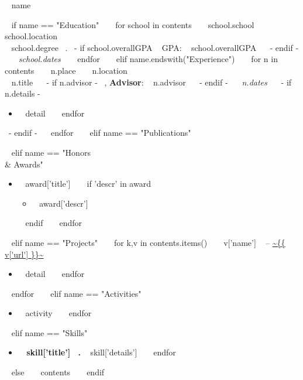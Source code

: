 \medskip

\begin{minipage}{\textwidth}
{\huge ~{{ name }}~ }

~{ if name == "Education" }~
  ~{ for school in contents }~
    {\large ~{{ school.school }}~ } \hfill ~{{ school.location }}~ \\
    ~{{ school.degree }}~.
    ~{- if school.overallGPA }~
      GPA: ~{{ school.overallGPA }}~
    ~{- endif -}~
    \hfill {\it ~{{ school.dates }}~}
    \bigskip
  ~{ endfor }~
~{ elif name.endswith("Experience") }~
  ~{ for n in contents }~
    {\large ~{{ n.place }}~ } \hfill ~{{ n.location }}~ \\
    ~{{ n.title }}~
    ~{- if n.advisor -}~
      , {\bf Advisor}: ~{{ n.advisor }}~
    ~{- endif -}~
    \hfill {\it ~{{ n.dates }}~}
    ~{- if n.details -}~
      \begin{itemize}
      ~{ for detail in n.details }~
        \item ~{{ detail }}~
      ~{ endfor }~
      \end{itemize}
    ~{- endif -}~
    \bigskip
  ~{ endfor }~
~{ elif name == "Publications" }~
  \nocite{*}
  \printbibliography[heading=none,type=inproceedings]
  \end{minipage}
  \begin{minipage}{\textwidth}
  \printbibliography[heading=none,type=article]
  \bigskip

~{ elif name == "Honors \\& Awards" }~
  \begin{itemize}
    ~{ for award in contents }~
      \item ~{{ award['title'] }}~
      ~{ if 'descr' in award }~
        \begin{itemize}
          \item ~{{ award['descr'] }}~
        \end{itemize}
      ~{ endif }~
    ~{ endfor }~
  \end{itemize}
  \bigskip
~{ elif name == "Projects" }~
  ~{ for k,v in contents.items() }~
    {\large ~{{ v['name'] }}~ -- \url{ ~{{ v['url'] }}~ } }
    \begin{itemize}
      ~{ for detail in v['details'] }~
        \item ~{{ detail }}~
      ~{ endfor }~
    \end{itemize}
    \bigskip
  ~{ endfor }~
~{ elif name == "Activities" }~
  \begin{itemize}
    ~{ for activity in contents }~
      \item ~{{ activity }}~
    ~{ endfor }~
  \end{itemize}
  \bigskip
~{ elif name == "Skills" }~
  \begin{itemize}
    ~{ for skill in contents }~
      \item { \bf ~{{ skill['title'] }}~. } ~{{ skill['details'] }}~
    ~{ endfor }~
  \end{itemize}
  \bigskip
~{ else }~
  ~{{ contents }}~
  \bigskip
~{ endif }~
\end{minipage}
